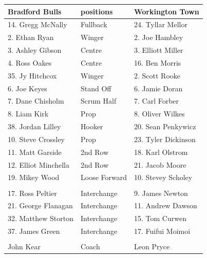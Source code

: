 \documentclass{article}
\begin{document}
\begin{tabular}{lll}
\toprule
Bradford Bulls & positions & Workington Town \\
\midrule
14. Gregg McNally & Fullback & 24. Tyllar Mellor \\
2. Ethan Ryan & Winger & 2. Joe Hambley \\
3. Ashley Gibson & Centre & 3. Elliott Miller \\
4. Ross Oakes & Centre & 16. Ben Morris \\
35. Jy Hitchcox & Winger & 2. Scott Rooke \\
6. Joe Keyes & Stand Off & 6. Jamie Doran \\
7. Dane Chisholm & Scrum Half & 7. Carl Forber \\
8. Liam Kirk & Prop & 8. Oliver Wilkes \\
38. Jordan Lilley & Hooker & 20. Sean Penkywicz \\
10. Steve Crossley & Prop & 23. Tyler Dickinson \\
11. Matt Garside & 2nd Row & 18. Karl Olstrom \\
12. Elliot Minchella & 2nd Row & 21. Jacob Moore \\
19. Mikey Wood & Loose Forward & 10. Stevey Scholey \\
 &  &  \\
17. Ross Peltier & Interchange & 9. James Newton \\
21. George Flanagan & Interchange & 11. Andrew Dawson \\
32. Matthew Storton & Interchange & 15. Tom Curwen \\
37. James Green & Interchange & 17. Fuifui Moimoi \\
 &  &  \\
John Kear & Coach & Leon Pryce \\
\bottomrule
\end{tabular}
\end{document}
